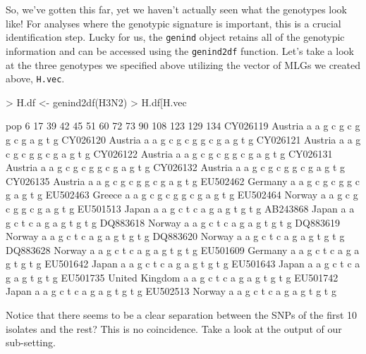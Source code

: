 \documentclass[letterpaper]{article}
\begin{document}
So, we've gotten this far, yet we haven't actually seen what the genotypes look like! For analyses where the genotypic signature is important, this is a crucial identification step. Lucky for us, the \texttt{genind} object retains all of the genotypic information and can be accessed using the \texttt{genind2df} function. Let's take a look at the three genotypes we specified above utilizing the vector of MLGs we created above, \texttt{H.vec}.
\begin{Schunk}
\begin{Sinput}
> H.df <- genind2df(H3N2)
> H.df[H.vec %
\end{Sinput}
\begin{Soutput}
                    pop 6 17 39 42 45 51 60 72 73 90 108 123 129 134
CY026119        Austria a  a  g  c  g  c  g  g  c  g   a   g   t   g
CY026120        Austria a  a  g  c  g  c  g  g  c  g   a   g   t   g
CY026121        Austria a  a  g  c  g  c  g  g  c  g   a   g   t   g
CY026122        Austria a  a  g  c  g  c  g  g  c  g   a   g   t   g
CY026131        Austria a  a  g  c  g  c  g  g  c  g   a   g   t   g
CY026132        Austria a  a  g  c  g  c  g  g  c  g   a   g   t   g
CY026135        Austria a  a  g  c  g  c  g  g  c  g   a   g   t   g
EU502462        Germany a  a  g  c  g  c  g  g  c  g   a   g   t   g
EU502463         Greece a  a  g  c  g  c  g  g  c  g   a   g   t   g
EU502464         Norway a  a  g  c  g  c  g  g  c  g   a   g   t   g
EU501513          Japan a  a  g  c  t  c  a  g  a  g   t   g   t   g
AB243868          Japan a  a  g  c  t  c  a  g  a  g   t   g   t   g
DQ883618         Norway a  a  g  c  t  c  a  g  a  g   t   g   t   g
DQ883619         Norway a  a  g  c  t  c  a  g  a  g   t   g   t   g
DQ883620         Norway a  a  g  c  t  c  a  g  a  g   t   g   t   g
DQ883628         Norway a  a  g  c  t  c  a  g  a  g   t   g   t   g
EU501609        Germany a  a  g  c  t  c  a  g  a  g   t   g   t   g
EU501642          Japan a  a  g  c  t  c  a  g  a  g   t   g   t   g
EU501643          Japan a  a  g  c  t  c  a  g  a  g   t   g   t   g
EU501735 United Kingdom a  a  g  c  t  c  a  g  a  g   t   g   t   g
EU501742          Japan a  a  g  c  t  c  a  g  a  g   t   g   t   g
EU502513         Norway a  a  g  c  t  c  a  g  a  g   t   g   t   g
\end{Soutput}
\end{Schunk}
Notice that there seems to be a clear separation between the SNPs of the first 10 isolates and the rest? This is no coincidence. Take a look at the output of our sub-setting.
\end{document}

